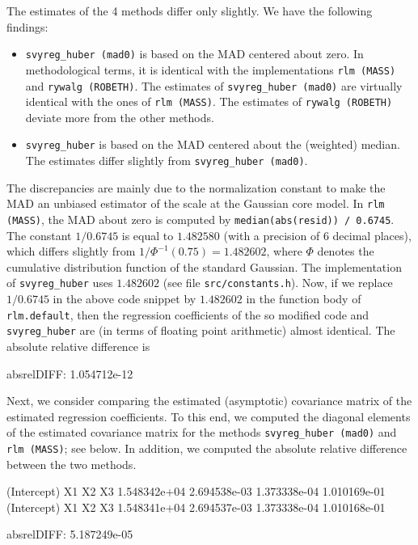 \documentclass[a4paper,oneside,11pt,DIV=12]{scrartcl}
\newcommand{\code}[1]{{\texttt{#1}}}
\begin{document}
\noindent The estimates of the 4 methods differ only slightly. We have the
following findings:
\begin{itemize}
    \item \code{svyreg\_huber (mad0)} is based on the MAD centered about
        zero. In methodological terms, it is identical with the
        implementations \code{rlm (MASS)} and \code{rywalg (ROBETH)}. The
        estimates of \code{svyreg\_huber (mad0)} are virtually identical
        with the ones of \code{rlm (MASS)}.  The estimates of
        \code{rywalg (ROBETH)} deviate more from the other methods.
    \item \code{svyreg\_huber} is based on the MAD centered about the
        (weighted) median. The estimates differ slightly from
         \code{svyreg\_huber (mad0)}.
\end{itemize}

\noindent The discrepancies are mainly due to the normalization constant
to make the MAD an unbiased estimator of the scale at the Gaussian core
model. In \code{rlm (MASS)}, the MAD about zero is computed by
\code{median(abs(resid)) / 0.6745}. The constant $1 / 0.6745$ is
equal to $1.482580$ (with a precision of 6 decimal places), which
differs slightly from $1/\Phi^{-1}(0.75)=1.482602$, where $\Phi$ denotes
the cumulative distribution function of the standard Gaussian.
The implementation of \code{svyreg\_huber} uses $1.482602$
(see file \code{src/constants.h}). Now, if we replace $1 / 0.6745$ in the
above code snippet by $1.482602$ in the function body of \code{rlm.default},
then the regression coefficients of the so modified code and
\code{svyreg\_huber} are (in terms of floating point arithmetic) almost
identical. The absolute relative difference is

\begin{Schunk}
\begin{Soutput}
absrelDIFF:  1.054712e-12 %
\end{Soutput}
\end{Schunk}

Next, we consider comparing the estimated (asymptotic) covariance matrix of
the estimated regression coefficients. To this end, we computed the diagonal
elements of the estimated covariance matrix for the
methods \code{svyreg\_huber (mad0)} and \code{rlm (MASS)}; see below. In
addition, we computed the absolute relative difference between the two
methods.

\begin{Schunk}
\begin{Soutput}
 (Intercept)           X1           X2           X3 
1.548342e+04 2.694538e-03 1.373338e-04 1.010169e-01 
 (Intercept)           X1           X2           X3 
1.548341e+04 2.694537e-03 1.373338e-04 1.010168e-01 

absrelDIFF:  5.187249e-05 %
\end{Soutput}
\end{Schunk}
\end{document}
